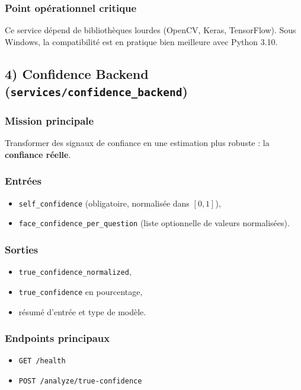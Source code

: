 \documentclass[12pt,a4paper]{article}
\begin{document}
\subsubsection{Point op\'erationnel critique}
Ce service d\'epend de biblioth\`eques lourdes (OpenCV, Keras, TensorFlow). Sous Windows, la compatibilit\'e est en pratique bien meilleure avec Python 3.10.

\subsection{4) Confidence Backend (\texttt{services/confidence\_backend})}
\subsubsection{Mission principale}
Transformer des signaux de confiance en une estimation plus robuste : la \textbf{confiance r\'eelle}.

\subsubsection{Entr\'ees}
\begin{itemize}
    \item \texttt{self\_confidence} (obligatoire, normalis\'ee dans $[0,1]$),
    \item \texttt{face\_confidence\_per\_question} (liste optionnelle de valeurs normalis\'ees).
\end{itemize}

\subsubsection{Sorties}
\begin{itemize}
    \item \texttt{true\_confidence\_normalized},
    \item \texttt{true\_confidence} en pourcentage,
    \item r\'esum\'e d'entr\'ee et type de mod\`ele.
\end{itemize}

\subsubsection{Endpoints principaux}
\begin{itemize}
    \item \texttt{GET /health}
    \item \texttt{POST /analyze/true-confidence}
\end{itemize}
\end{document}
